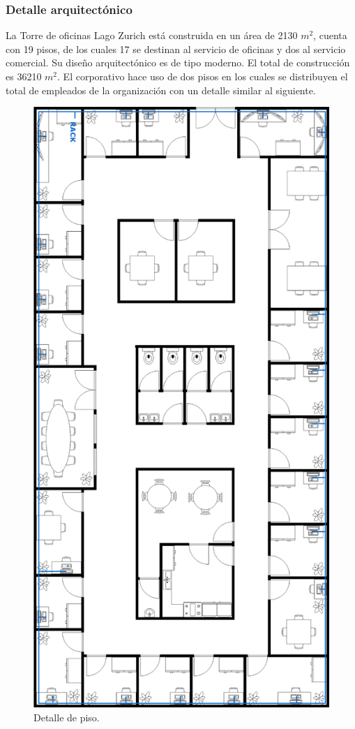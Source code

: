 \documentclass[12pt,letterpaper]{article}
\begin{document}
\subsubsection{Detalle arquitectónico}
La Torre de oficinas Lago Zurich está construida en un área de 2130 $m^2$, cuenta con 19 pisos, 
de los cuales 17 se destinan al servicio de oficinas y dos al servicio comercial. Su diseño 
arquitectónico es de tipo moderno. El total de construcción es 36210 $m^2$. \cite{deatllearq} 
El corporativo hace uso de dos pisos en los cuales se distribuyen el total de empleados de la organización con un detalle similar 
al siguiente.
\begin{figure}[ht]
    \centering
    \includegraphics[scale=.75]{imagenes/detalle.png}
    \caption{Detalle de piso.}
\end{figure}
\end{document}
